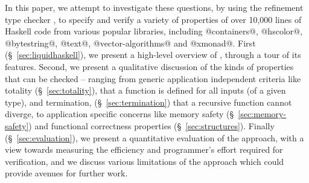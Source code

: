 In this paper, we attempt to investigate these questions, by using the
refinement type checker \toolname, to specify and verify a variety of 
properties of over 10,000 lines of Haskell code from various popular 
libraries, including @containers@, \hbox{@hscolor@,} @bytestring@, @text@, 
@vector-algorithms@ and @xmonad@. 
%
First (\S~\ref{sec:liquidhaskell}), 
we present a high-level overview of \toolname, through a tour 
of its features.
%
Second, we present a qualitative discussion of the kinds of properties
that can be checked -- ranging from generic application independent 
criteria like totality (\S~\ref{sec:totality}), 
\ie that a function is defined for all inputs (of a given type),  
and termination, 
(\S~\ref{sec:termination}) 
\ie that a recursive function cannot diverge,
to application specific concerns like memory safety (\S~\ref{sec:memory-safety}) 
and functional correctness properties (\S~\ref{sec:structures}).
%
Finally (\S~\ref{sec:evaluation}), we present a quantitative evaluation of the approach, with a view
towards measuring the efficiency and programmer's effort required for
verification, 
and we discuss various limitations of the approach which could
provide avenues for further work.


